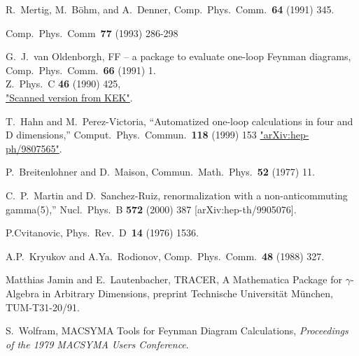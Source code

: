 \begin{thebibliography}{99}
 R.~Mertig, M.~B\"ohm, and A.~Denner,
Comp.~Phys.~Comm.~{\bf 64} (1991) 345. 

Comp.~Phys.~Comm~{\bf 77} (1993) 286-298

G.~J.~van Oldenborgh, FF -- a package to evaluate one-loop Feynman diagrams,
Comp.~Phys.~Comm.~{\bf 66} (1991) 1.\\
Z.\ Phys.\ C {\bf 46} (1990) 425,\\
\href{http://ccdb3fs.kek.jp/cgi-bin/img_index?9004168}{"Scanned version from KEK"}.

T.~Hahn and M.~Perez-Victoria,
``Automatized one-loop calculations in four and D dimensions,''
Comput.\ Phys.\ Commun.\  {\bf 118} (1999) 153
\href{http://xxx.lanl.gov/abs/hep-ph/9807565}{"arXiv:hep-ph/9807565"}.

P.~Breitenlohner and D.~Maison,
Commun.\ Math.\ Phys.\  {\bf 52} (1977) 11.

C.~P.~Martin and D.~Sanchez-Ruiz,
renormalization with a non-anticommuting gamma(5),''
Nucl.\ Phys.\ B {\bf 572} (2000) 387
[arXiv:hep-th/9905076].

P.Cvitanovic, Phys.~Rev.~D~{\bf 14} (1976) 1536.

A.P.~Kryukov and A.Ya.~Rodionov, Comp.~Phys.~Comm.~{\bf 48} (1988) 
327.

Matthias Jamin and E.~Lautenbacher, 
TRACER, A Mathematica Package for $\gamma$-Algebra in Arbitrary Dimensions,
preprint Technische Universit\"at M\"unchen, TUM-T31-20/91.

 S.~Wolfram, MACSYMA Tools for Feynman Diagram Calculations,
{\sl Proceedings of the 1979 MACSYMA Users Conference}.

\end{thebibliography}
